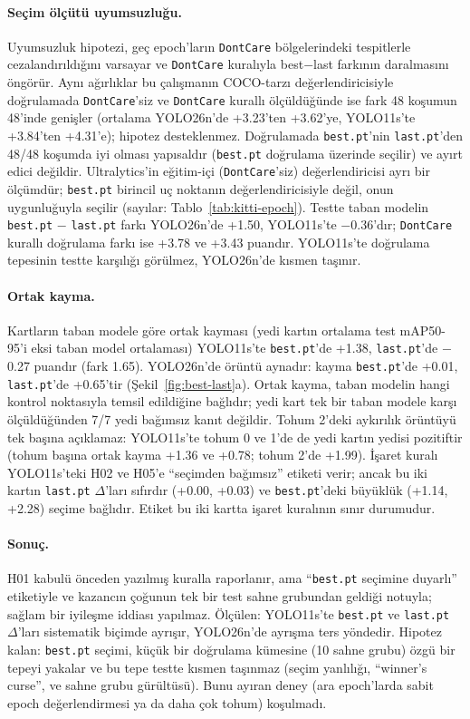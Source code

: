 \paragraph{Seçim ölçütü uyumsuzluğu.}
Uyumsuzluk hipotezi, geç epoch'ların \texttt{DontCare} bölgelerindeki tespitlerle cezalandırıldığını varsayar ve \texttt{DontCare} kuralıyla best$-$last farkının daralmasını öngörür. Aynı ağırlıklar bu çalışmanın COCO-tarzı değerlendiricisiyle doğrulamada \texttt{DontCare}'siz ve \texttt{DontCare} kurallı ölçüldüğünde ise fark 48 koşumun 48'inde genişler (ortalama YOLO26n'de +3.23'ten +3.62'ye, YOLO11s'te +3.84'ten +4.31'e); hipotez desteklenmez. Doğrulamada \texttt{best.pt}'nin \texttt{last.pt}'den 48/48 koşumda iyi olması yapısaldır (\texttt{best.pt} doğrulama üzerinde seçilir) ve ayırt edici değildir. Ultralytics'in eğitim-içi (\texttt{DontCare}'siz) değerlendiricisi ayrı bir ölçümdür; \texttt{best.pt} birincil uç noktanın değerlendiricisiyle değil, onun uygunluğuyla seçilir (sayılar: Tablo~\ref{tab:kitti-epoch}). Testte taban modelin \texttt{best.pt} $-$ \texttt{last.pt} farkı YOLO26n'de +1.50, YOLO11s'te $-$0.36'dır; \texttt{DontCare} kurallı doğrulama farkı ise +3.78 ve +3.43 puandır. YOLO11s'te doğrulama tepesinin testte karşılığı görülmez, YOLO26n'de kısmen taşınır.

\paragraph{Ortak kayma.}
Kartların taban modele göre ortak kayması (yedi kartın ortalama test mAP50-95'i eksi taban model ortalaması) YOLO11s'te \texttt{best.pt}'de +1.38, \texttt{last.pt}'de $-$0.27 puandır (fark 1.65). YOLO26n'de örüntü aynadır: kayma \texttt{best.pt}'de +0.01, \texttt{last.pt}'de +0.65'tir (Şekil~\ref{fig:best-last}a). Ortak kayma, taban modelin hangi kontrol noktasıyla temsil edildiğine bağlıdır; yedi kart tek bir taban modele karşı ölçüldüğünden 7/7 yedi bağımsız kanıt değildir. Tohum 2'deki aykırılık örüntüyü tek başına açıklamaz: YOLO11s'te tohum 0 ve 1'de de yedi kartın yedisi pozitiftir (tohum başına ortak kayma +1.36 ve +0.78; tohum 2'de +1.99). İşaret kuralı YOLO11s'teki H02 ve H05'e ``seçimden bağımsız'' etiketi verir; ancak bu iki kartın \texttt{last.pt} $\Delta$'ları sıfırdır (+0.00, +0.03) ve \texttt{best.pt}'deki büyüklük (+1.14, +2.28) seçime bağlıdır. Etiket bu iki kartta işaret kuralının sınır durumudur.

\paragraph{Sonuç.}
H01 kabulü önceden yazılmış kuralla raporlanır, ama ``\texttt{best.pt} seçimine duyarlı'' etiketiyle ve kazancın çoğunun tek bir test sahne grubundan geldiği notuyla; sağlam bir iyileşme iddiası yapılmaz. Ölçülen: YOLO11s'te \texttt{best.pt} ve \texttt{last.pt} $\Delta$'ları sistematik biçimde ayrışır, YOLO26n'de ayrışma ters yöndedir. Hipotez kalan: \texttt{best.pt} seçimi, küçük bir doğrulama kümesine (10 sahne grubu) özgü bir tepeyi yakalar ve bu tepe testte kısmen taşınmaz (seçim yanlılığı, ``winner's curse'', ve sahne grubu gürültüsü). Bunu ayıran deney (ara epoch'larda sabit epoch değerlendirmesi ya da daha çok tohum) koşulmadı.

